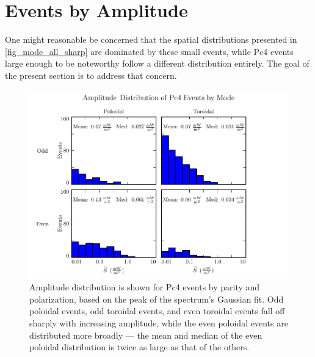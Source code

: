 



\section{Events by Amplitude}
  \label{sec_amp}

One might reasonable be concerned that the spatial distributions presented in \cref{fig_mode_all_sharp} are dominated by these small events, while Pc4 events large enough to be noteworthy follow a different distribution entirely. The goal of the present section is to address that concern. 

\begin{figure}[!htb]
    \centering
    \includegraphics[width=\textwidth]{figures/amp.pdf}
    \caption[Amplitude Distribution of Pc4 Events by Mode]{
      Amplitude distribution is shown for Pc4 events by parity and polarization, based on the peak of the spectrum's Gaussian fit. Odd poloidal events, odd toroidal events, and even toroidal events fall off sharply with increasing amplitude, while the even poloidal events are distributed more broadly --- the mean and median of the even poloidal distribution is twice as large as that of the others. 
    }
    \label{fig_amp}
\end{figure}

